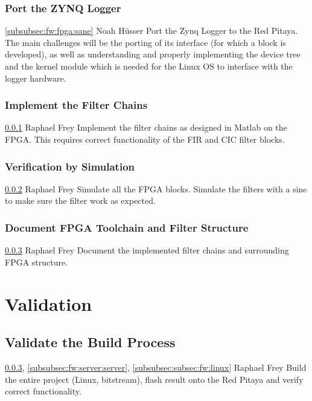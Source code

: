 \documentclass[a4paper,oneside]{alpenspecs/alpenspecs}
\begin{document}
\subsubsection{Port the ZYNQ Logger}
\label{subsubsec:fw:fpga:logger}
\wpac
    {}
    {}
    {}
    {\ref{subsubsec:fw:fpga:sane}}
    {}
    {Noah H\"usser}
    {%
        Port the Zynq Logger to the Red Pitaya. The main challenges will be
        the porting of its interface (for which a block 
        is developed), as well as understanding and properly implementing the
        device tree and the kernel module which is needed for the Linux OS
        to interface with the logger hardware.
    }

\subsubsection{Implement the Filter Chains}
\label{subsubsec:fw:fpga:filters}
\wpac
    {}
    {}
    {}
    {\ref{subsubsec:fw:fpga:logger}}
    {}
    {Raphael Frey}
    {%
        Implement the filter  chains as designed in Matlab on  the FPGA.  This
        requires correct functionality of the FIR and CIC filter blocks.
    }

\subsubsection{Verification by Simulation}
\label{subsubsec:fw:fpga:sim}
\wpac
    {}
    {}
    {}
    {\ref{subsubsec:fw:fpga:filters}}
    {}
    {Raphael Frey}
    {%
        Simulate all  the FPGA blocks.   Simulate the  filters with a  sine to
        make sure the filter work as expected.
    }

\subsubsection{Document FPGA Toolchain and Filter Structure}
\label{subsubsec:fw:fpga:doc}
\wpac
    {}
    {}
    {}
    {\ref{subsubsec:fw:fpga:sim}}
    {}
    {Raphael Frey}
    {%
        Document the implemented filter chains and surrounding FPGA structure.
    }

\section{Validation}
\label{sec:validation}

\subsection{Validate the Build Process}
\label{subsec:validation:build}
\wpac
    {}
    {}
    {}
    {\ref{subsubsec:fw:fpga:sim}, \ref{subsubsec:fw:server:server}, \ref{subsubsec:subsec:fw:linux}}
    {}
    {Raphael Frey}
    {%
        Build the entire project (Linux, bitstream), flash result onto the Red
        Pitaya and verify correct functionality.
    }
\end{document}
